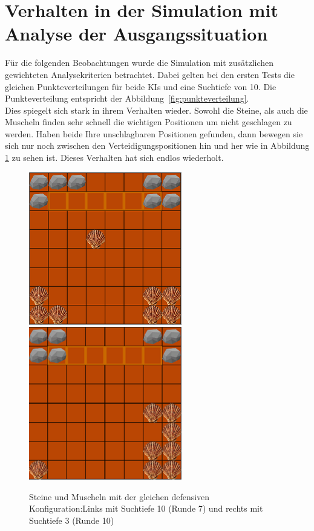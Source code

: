 \section{Verhalten in der Simulation mit Analyse der Ausgangssituation}
\label{ch:Evaluierung:sec:SimulationWithAnalyse}
Für die folgenden Beobachtungen wurde die Simulation mit zusätzlichen gewichteten Analysekriterien betrachtet. Dabei gelten bei den ersten Tests die gleichen Punkteverteilungen für beide KIs und eine Suchtiefe von 10. Die Punkteverteilung entspricht der Abbildung~\ref{fig:punkteverteilung}.\\
Dies spiegelt sich stark in ihrem Verhalten wieder. Sowohl die Steine, als auch die Muscheln finden sehr schnell die wichtigen Positionen um nicht geschlagen zu werden. Haben beide Ihre unschlagbaren Positionen gefunden, dann bewegen sie sich nur noch zwischen den Verteidigungspositionen hin und her wie in Abbildung \ref{fig:hinundher} zu sehen ist. Dieses Verhalten hat sich endlos wiederholt.
\begin{figure}[h]
	\centering
	\includegraphics{img/mitAnalyse/hinundherCorner}
		\includegraphics{img/mitAnalyse/hinundherCorner3}
	\caption{Steine und Muscheln mit der gleichen defensiven Konfiguration:\newline Links mit Suchtiefe 10 (Runde 7) und rechts mit Suchtiefe 3 (Runde 10)}
	\label{fig:hinundher}
\end{figure}

